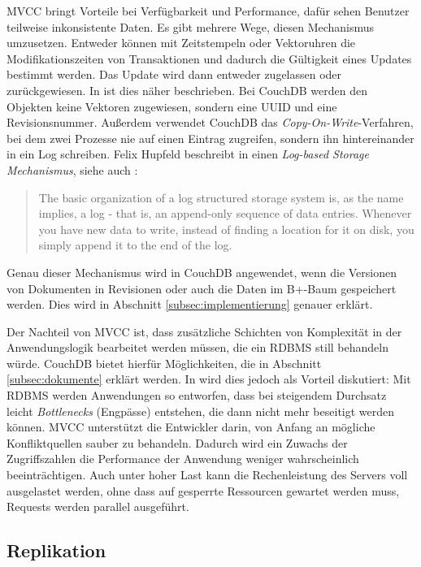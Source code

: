 MVCC bringt Vorteile bei Verfügbarkeit und Performance, dafür sehen Benutzer teilweise inkonsistente Daten. Es gibt mehrere Wege, diesen Mechanismus umzusetzen. Entweder können mit Zeitstempeln oder Vektoruhren die Modifikationszeiten von Transaktionen und dadurch die Gültigkeit eines Updates bestimmt werden. Das Update wird dann entweder zugelassen oder zurückgewiesen. In  ist dies näher beschrieben. Bei CouchDB werden den Objekten keine Vektoren zugewiesen, sondern eine UUID und eine Revisionsnummer. Außerdem verwendet CouchDB das \textit{Copy-On-Write}-Verfahren, bei dem zwei Prozesse nie auf einen Eintrag zugreifen, sondern ihn hintereinander in ein Log schreiben. Felix Hupfeld beschreibt in  einen \textit{Log-based Storage Mechanismus}, siehe auch \cite{logstructuredstorage}: 

\begin{quote}
The basic organization of a log structured storage system is, as the name implies, a log - that is, an append-only sequence of data entries. Whenever you have new data to write, instead of finding a location for it on disk, you simply append it to the end of the log.
\end{quote}

Genau dieser Mechanismus wird in CouchDB angewendet, wenn die Versionen von Dokumenten in Revisionen oder auch die Daten im B+-Baum gespeichert werden. Dies wird in Abschnitt \ref{subsec:implementierung} genauer erklärt. 

Der Nachteil von MVCC ist, dass zusätzliche Schichten von Komplexität in der Anwendungslogik bearbeitet werden müssen, die ein RDBMS still behandeln würde. CouchDB bietet hierfür Möglichkeiten, die in Abschnitt \ref{subsec:dokumente} erklärt werden. In  wird dies jedoch als Vorteil diskutiert: Mit RDBMS werden Anwendungen so entworfen, dass bei steigendem Durchsatz leicht \textit{Bottlenecks} (Engpässe) entstehen, die dann nicht mehr beseitigt werden können. MVCC unterstützt die Entwickler darin, von Anfang an mögliche Konfliktquellen sauber zu behandeln. Dadurch wird ein Zuwachs der Zugriffszahlen die Performance der Anwendung weniger wahrscheinlich beeinträchtigen. Auch unter hoher Last kann die Rechenleistung des Servers voll ausgelastet werden, ohne dass auf gesperrte Ressourcen gewartet werden muss, Requests werden parallel ausgeführt. 


\subsection{Replikation}
\label{subsec:replikation-theorie}


